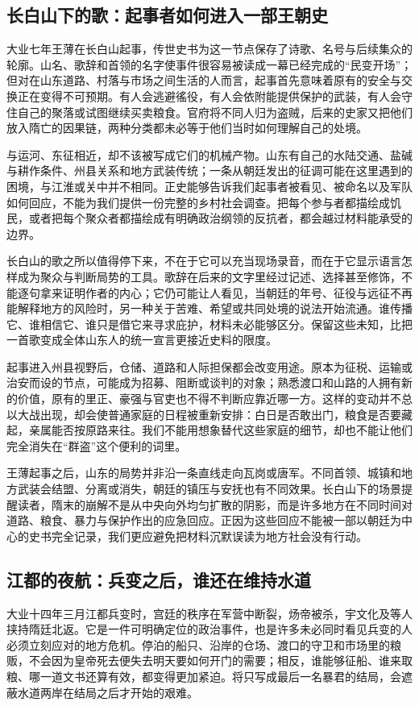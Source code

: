 \subsection{长白山下的歌：起事者如何进入一部王朝史}
大业七年王薄在长白山起事，传世史书为这一节点保存了诗歌、名号与后续集众的轮廓。山名、歌辞和首领的名字使事件很容易被读成一幕已经完成的“民变开场”；但对在山东道路、村落与市场之间生活的人而言，起事首先意味着原有的安全与交换正在变得不可预期。有人会逃避徭役，有人会依附能提供保护的武装，有人会守住自己的聚落或试图继续买卖粮食。官府将不同人归为盗贼，后来的史家又把他们放入隋亡的因果链，两种分类都未必等于他们当时如何理解自己的处境。

与运河、东征相近，却不该被写成它们的机械产物。山东有自己的水陆交通、盐碱与耕作条件、州县关系和地方武装传统；一条从朝廷发出的征调可能在这里遇到的困境，与江淮或关中并不相同。正史能够告诉我们起事者被看见、被命名以及军队如何回应，不能为我们提供一份完整的乡村社会调查。把每个参与者都描绘成饥民，或者把每个聚众者都描绘成有明确政治纲领的反抗者，都会越过材料能承受的边界。

长白山的歌之所以值得停下来，不在于它可以充当现场录音，而在于它显示语言怎样成为聚众与判断局势的工具。歌辞在后来的文字里经过记述、选择甚至修饰，不能逐句拿来证明作者的内心；它仍可能让人看见，当朝廷的年号、征役与远征不再能解释地方的风险时，另一种关于苦难、希望或共同处境的说法开始流通。谁传播它、谁相信它、谁只是借它来寻求庇护，材料未必能够区分。保留这些未知，比把一首歌变成全体山东人的统一宣言更接近史料的限度。

起事进入州县视野后，仓储、道路和人际担保都会改变用途。原本为征税、运输或治安而设的节点，可能成为招募、阻断或谈判的对象；熟悉渡口和山路的人拥有新的价值，原有的里正、豪强与官吏也不得不判断应靠近哪一方。这样的变动并不总以大战出现，却会使普通家庭的日程被重新安排：白日是否敢出门，粮食是否要藏起，亲属能否按原路来往。我们不能用想象替代这些家庭的细节，却也不能让他们完全消失在“群盗”这个便利的词里。

王薄起事之后，山东的局势并非沿一条直线走向瓦岗或唐军。不同首领、城镇和地方武装会结盟、分离或消失，朝廷的镇压与安抚也有不同效果。长白山下的场景提醒读者，隋末的崩解不是从中央向外均匀扩散的阴影，而是许多地方在不同时间对道路、粮食、暴力与保护作出的应急回应。正因为这些回应不能被一部以朝廷为中心的史书完全记录，我们更应避免把材料沉默误读为地方社会没有行动。

\subsection{江都的夜航：兵变之后，谁还在维持水道}
大业十四年三月江都兵变时，宫廷的秩序在军营中断裂，炀帝被杀，宇文化及等人挟持隋廷北返。它是一件可明确定位的政治事件，也是许多未必同时看见兵变的人必须立刻应对的地方危机。停泊的船只、沿岸的仓场、渡口的守卫和市场里的粮贩，不会因为皇帝死去便失去明天要如何开门的需要；相反，谁能够征船、谁来取粮、哪一道文书还算有效，都变得更加紧迫。将只写成最后一名暴君的结局，会遮蔽水道两岸在结局之后才开始的艰难。

